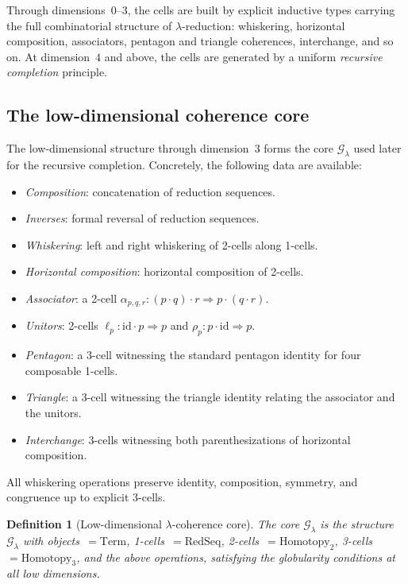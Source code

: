 \documentclass[webpdf,traditional,large,numbered]{oup-authoring-template}
\theoremstyle{thmstyleone}%
\theoremstyle{thmstyletwo}%
\theoremstyle{thmstylethree}%
\newtheorem{definition}[theorem]{Definition}
\newcommand{\ReductionSeq}{\mathrm{RedSeq}}
\begin{document}
Through dimensions~$0$--$3$, the cells are built by explicit inductive types
carrying the full combinatorial structure of $\lambda$-reduction: whiskering,
horizontal composition, associators, pentagon and triangle coherences,
interchange, and so on. At dimension~$4$ and above, the cells are generated by
a uniform \emph{recursive completion} principle.

\subsection{The low-dimensional coherence core}

The low-dimensional structure through dimension~3 forms the core
$\mathscr{G}_\lambda$ used later for the recursive completion. Concretely, the
following data are available:

\begin{itemize}
  \item \emph{Composition}: concatenation of reduction sequences.
  \item \emph{Inverses}: formal reversal of reduction sequences.
  \item \emph{Whiskering}: left and right whiskering of 2-cells along 1-cells.
  \item \emph{Horizontal composition}: horizontal composition of 2-cells.
  \item \emph{Associator}: a 2-cell
    $\alpha_{p,q,r} : (p \cdot q) \cdot r \Rightarrow p \cdot (q \cdot r)$.
  \item \emph{Unitors}: 2-cells $\ell_p : \mathrm{id} \cdot p \Rightarrow p$
    and $\rho_p : p \cdot \mathrm{id} \Rightarrow p$.
  \item \emph{Pentagon}: a 3-cell witnessing the standard pentagon identity for
    four composable 1-cells.
  \item \emph{Triangle}: a 3-cell witnessing the triangle identity relating the
    associator and the unitors.
  \item \emph{Interchange}: 3-cells witnessing both parenthesizations of
    horizontal composition.
\end{itemize}

All whiskering operations preserve identity, composition, symmetry, and
congruence up to explicit 3-cells.

\begin{definition}[Low-dimensional $\lambda$-coherence core]
  The core $\mathscr{G}_\lambda$ is the structure
  $\mathscr{G}_\lambda$ with objects~$= \mathrm{Term}$, 1-cells~$=
  \ReductionSeq$, 2-cells~$= \mathrm{Homotopy}_2$, 3-cells~$=
  \mathrm{Homotopy}_3$, and the above operations, satisfying the globularity
  conditions at all low dimensions.
\end{definition}
\end{document}

